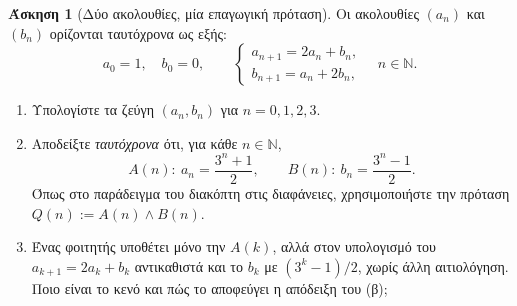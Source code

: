 \documentclass[11pt,a4paper]{article}
\theoremstyle{definition}
\newtheorem{question}{Άσκηση}
\newcommand{\N}{\mathbb{N}}
\newcommand{\gi}[1]{\item[(#1)]}
\begin{document}
 

\begin{question}[Δύο ακολουθίες, μία επαγωγική πρόταση]
Οι ακολουθίες $(a_n)$ και $(b_n)$ ορίζονται ταυτόχρονα ως εξής:
\[
a_0=1,\quad b_0=0,\qquad
\begin{cases}
a_{n+1}=2a_n+b_n,\\
b_{n+1}=a_n+2b_n,
\end{cases}
\quad n\in\N.
\]
\begin{enumerate}
\gi{α} Υπολογίστε τα ζεύγη $(a_n,b_n)$ για $n=0,1,2,3$.
\gi{β} Αποδείξτε \emph{ταυτόχρονα} ότι, για κάθε $n\in\N$,
\[
A(n):\ a_n=\frac{3^n+1}{2},\qquad
B(n):\ b_n=\frac{3^n-1}{2}.
\]
Όπως στο παράδειγμα του διακόπτη στις διαφάνειες,
χρησιμοποιήστε την πρόταση $Q(n):=A(n)\wedge B(n)$.
\gi{γ} Ένας φοιτητής υποθέτει μόνο την $A(k)$, αλλά στον υπολογισμό
του $a_{k+1}=2a_k+b_k$ αντικαθιστά και το $b_k$ με
$(3^k-1)/2$, χωρίς άλλη αιτιολόγηση.
Ποιο είναι το κενό και πώς το αποφεύγει η απόδειξη του (β);
\end{enumerate}
\end{question}
\end{document}
